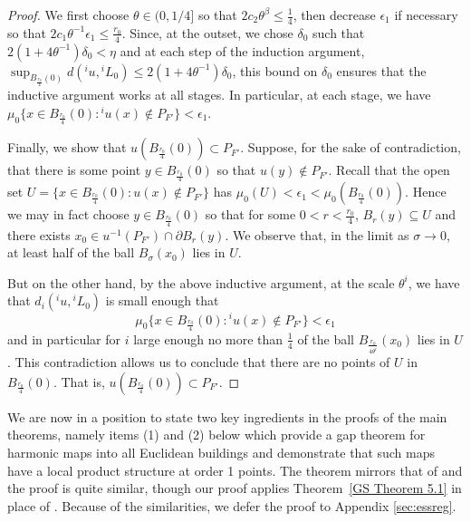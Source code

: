 \documentclass[12pt]{amsart}
\theoremstyle{definition}
\numberwithin{equation}{section}
\begin{document}
\begin{proof}
We first choose $\theta\in(0, 1/4]$ so that $2c_2\theta^\beta\leq\frac{1}{4}$, then decrease $\epsilon_1$ if necessary so that $2c_1\theta^{-1}\epsilon_1\leq\frac{r_0}4$. Since, at the outset, we chose $\delta_0$ such that $2(1+4\theta^{-1})\delta_0< \eta$ and at each step of the induction argument, $\sup_{B_{\frac{r_0}4}(0)}d({^iu},{^iL}_0)\leq 2(1+4\theta^{-1})\delta_0$, this bound on $\delta_0$ 
 ensures that the inductive argument works at all stages.  In particular, at each stage, we have $\mu_0\{x\in B_{\frac {r_0}{4}}(0):{^i}u(x)\notin P_{F'}\}<\epsilon_1$.

Finally, we show that $u(B_{\frac{r_0}{4}}(0))\subset P_{F'}$. Suppose, for the sake of contradiction, that there is some point $y\in B_{\frac{r_0}{4}}(0)$ so that $u(y)\notin P_{F'}$.  Recall that the open set $U=\{x\in B_{\frac{r_0}{4}}(0):u(x)\notin P_{F'}\}$ has $\mu_0(U)<\epsilon_1<\mu_0(B_{\frac{r_0}{4}}(0))$.  Hence we may in fact choose $y \in B_{\frac{r_0}{4}}(0)$ so that for some $0<r<\frac{r_0}{4}$, $B_r(y)\subseteq U$ and there exists $x_0 \in u^{-1}(P_{F'}) \cap \partial B_r(y)$. We observe that, in the limit as $\sigma\to0$, at least half of the ball $B_\sigma(x_0)$ lies in $U$.

But on the other hand, by the above inductive argument, at the scale $\theta^i$, we have that $d_i(^iu,{^iL}_0)$ is small enough that
\[
\mu_0\{x\in B_{\frac{r_0}{4}}(0):{^iu}(x)\notin P_{F'}\}<\epsilon_1
\]
and in particular for $i$ large enough no more than $\frac{1}{4}$ of the ball $B_{\frac{r_0}{4\theta^i}}(x_0)$ lies in $U$.  This contradiction allows us to conclude that there are no points of $U$ in $B_{\frac{r_0}4}(0)$. That is, $u(B_{\frac{r_0}4}(0))\subset P_{F'}$.
\end{proof}


We are now in a position to state two key ingredients in the proofs of the main theorems, namely items (1) and (2) below which provide a gap theorem for harmonic maps into all Euclidean buildings and demonstrate that such maps have a local product structure at order 1 points. The theorem mirrors that of \cite[Theorem 6.3]{gromov-schoen} and the proof is quite similar, though 
our proof applies Theorem~\ref{GS Theorem 5.1} in place of \cite[Theorem 5.1]{gromov-schoen}.
  Because of the similarities, we defer the proof to Appendix \ref{sec:essreg}.
\end{document}
